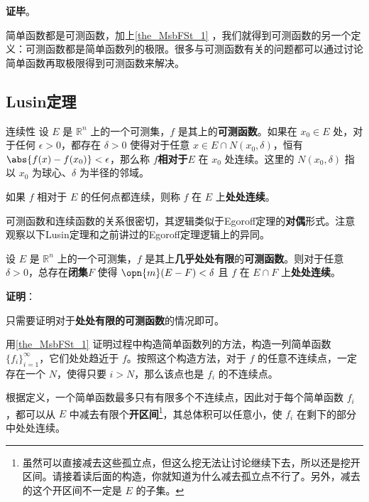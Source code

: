 \textbf{证毕}。

简单函数都是可测函数，加上\autoref{the_MsbFSt_1} ，我们就得到可测函数的另一个定义：可测函数都是简单函数列的极限。很多与可测函数有关的问题都可以通过讨论简单函数再取极限得到可测函数来解决。



\subsection{Lusin定理}

\begin{definition}{连续性}\label{def_MsbFSt_2}
设 $E$ 是 $\mathbb{R}^n$ 上的一个可测集，$f$ 是其上的\textbf{可测函数}。如果在 $x_0\in E$ 处，对于任何 $\epsilon>0$，都存在 $\delta>0$ 使得对于任意 $x\in E\cap N(x_0, \delta)$，恒有 $\abs{f(x)-f(x_0)}<\epsilon$，那么称 $f$\textbf{相对于}$E$ 在 $x_0$ 处连续。这里的 $N(x_0, \delta)$ 指以 $x_0$ 为球心、$\delta$ 为半径的邻域。

如果 $f$ 相对于 $E$ 的任何点都连续，则称 $f$ 在 $E$ 上\textbf{处处连续}。
\end{definition}

可测函数和连续函数的关系很密切，其逻辑类似于Egoroff定理的\textbf{对偶}形式。注意观察以下Lusin定理和之前讲过的Egoroff定理逻辑上的异同。

\begin{theorem}{}\label{the_MsbFSt_2}

设 $E$ 是 $\mathbb{R}^n$ 上的一个可测集，$f$ 是其上\textbf{几乎处处有限}的\textbf{可测函数}。则对于任意 $\delta>0$，总存在\textbf{闭集}$F$ 使得 $\opn{m}(E-F)<\delta$ 且 $f$ 在 $E\cap F$ 上\textbf{处处连续}。

\end{theorem}

\textbf{证明}：

只需要证明对于\textbf{处处有限的可测函数}的情况即可。

用\autoref{the_MsbFSt_1}  证明过程中构造简单函数列的方法，构造一列简单函数 $\{f_i\}_{i=1}^\infty$，它们处处趋近于 $f$。按照这个构造方法，对于 $f$ 的任意不连续点，一定存在一个 $N$，使得只要 $i>N$，那么该点也是 $f_i$ 的不连续点。

根据定义，一个简单函数最多只有有限多个不连续点，因此对于每个简单函数 $f_i$，都可以从 $E$ 中减去有限个\textbf{开区间}\footnote{虽然可以直接减去这些孤立点，但这么挖无法让讨论继续下去，所以还是挖开区间。请接着读后面的构造，你就知道为什么减去孤立点不行了。另外，减去的这个开区间不一定是 $E$ 的子集。}，其总体积可以任意小，使 $f_i$ 在剩下的部分中处处连续。

